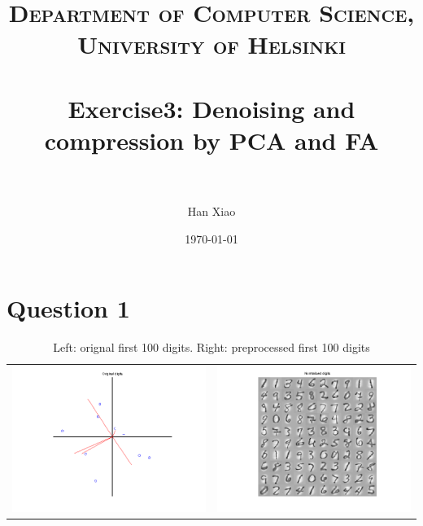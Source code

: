 \documentclass[paper=a4, fontsize=11pt]{scrartcl} %
\title{
\normalfont \normalsize
\textsc{Department of Computer Science, University of Helsinki} \\ [25pt] %
\horrule{0.5pt} \\[0.4cm] %
\huge Exercise3: Denoising and compression by PCA and FA \\ %
\horrule{2pt} \\[0.5cm] %
}
\author{Han Xiao} %
\date{\normalsize\today} %
\numberwithin{equation}{section} %
\numberwithin{figure}{section} %
\numberwithin{table}{section} %
\begin{document}
\maketitle %


\section{Question 1}

\begin{table}[H]
\caption{Left: orignal first 100 digits. \newline Right: preprocessed first 100 digits}
\centering
\begin{tabular}{cc}
  \includegraphics[scale=.4]{original_digits} &
  \includegraphics[scale=.4]{normalized_digits}
\end {tabular}
\end {table}
\end{document}
